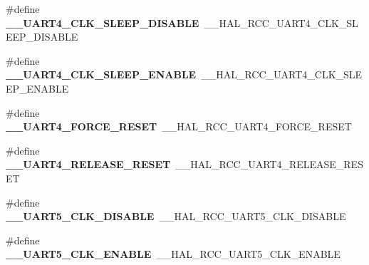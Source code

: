 \begin{DoxyCompactItemize}
\item 
\hypertarget{group___h_a_l___r_c_c___aliased_ga6eabcf2af5aee392a64df6c80f653d8c}{\#define {\bfseries \-\_\-\-\_\-\-U\-A\-R\-T4\-\_\-\-C\-L\-K\-\_\-\-S\-L\-E\-E\-P\-\_\-\-D\-I\-S\-A\-B\-L\-E}~\-\_\-\-\_\-\-H\-A\-L\-\_\-\-R\-C\-C\-\_\-\-U\-A\-R\-T4\-\_\-\-C\-L\-K\-\_\-\-S\-L\-E\-E\-P\-\_\-\-D\-I\-S\-A\-B\-L\-E}\label{group___h_a_l___r_c_c___aliased_ga6eabcf2af5aee392a64df6c80f653d8c}

\item 
\hypertarget{group___h_a_l___r_c_c___aliased_ga4c3526cdbbac0bdd4c1b71ff91685d08}{\#define {\bfseries \-\_\-\-\_\-\-U\-A\-R\-T4\-\_\-\-C\-L\-K\-\_\-\-S\-L\-E\-E\-P\-\_\-\-E\-N\-A\-B\-L\-E}~\-\_\-\-\_\-\-H\-A\-L\-\_\-\-R\-C\-C\-\_\-\-U\-A\-R\-T4\-\_\-\-C\-L\-K\-\_\-\-S\-L\-E\-E\-P\-\_\-\-E\-N\-A\-B\-L\-E}\label{group___h_a_l___r_c_c___aliased_ga4c3526cdbbac0bdd4c1b71ff91685d08}

\item 
\hypertarget{group___h_a_l___r_c_c___aliased_ga3fa11393865d20cc6a9dd7a3bb49a7e8}{\#define {\bfseries \-\_\-\-\_\-\-U\-A\-R\-T4\-\_\-\-F\-O\-R\-C\-E\-\_\-\-R\-E\-S\-E\-T}~\-\_\-\-\_\-\-H\-A\-L\-\_\-\-R\-C\-C\-\_\-\-U\-A\-R\-T4\-\_\-\-F\-O\-R\-C\-E\-\_\-\-R\-E\-S\-E\-T}\label{group___h_a_l___r_c_c___aliased_ga3fa11393865d20cc6a9dd7a3bb49a7e8}

\item 
\hypertarget{group___h_a_l___r_c_c___aliased_ga0ba28f261c094e2f6df78da62042fb59}{\#define {\bfseries \-\_\-\-\_\-\-U\-A\-R\-T4\-\_\-\-R\-E\-L\-E\-A\-S\-E\-\_\-\-R\-E\-S\-E\-T}~\-\_\-\-\_\-\-H\-A\-L\-\_\-\-R\-C\-C\-\_\-\-U\-A\-R\-T4\-\_\-\-R\-E\-L\-E\-A\-S\-E\-\_\-\-R\-E\-S\-E\-T}\label{group___h_a_l___r_c_c___aliased_ga0ba28f261c094e2f6df78da62042fb59}

\item 
\hypertarget{group___h_a_l___r_c_c___aliased_gafe498a3d4cfc62755072abdb7b20b865}{\#define {\bfseries \-\_\-\-\_\-\-U\-A\-R\-T5\-\_\-\-C\-L\-K\-\_\-\-D\-I\-S\-A\-B\-L\-E}~\-\_\-\-\_\-\-H\-A\-L\-\_\-\-R\-C\-C\-\_\-\-U\-A\-R\-T5\-\_\-\-C\-L\-K\-\_\-\-D\-I\-S\-A\-B\-L\-E}\label{group___h_a_l___r_c_c___aliased_gafe498a3d4cfc62755072abdb7b20b865}

\item 
\hypertarget{group___h_a_l___r_c_c___aliased_ga7b4b49db3dac7e83c37beed3dfd19980}{\#define {\bfseries \-\_\-\-\_\-\-U\-A\-R\-T5\-\_\-\-C\-L\-K\-\_\-\-E\-N\-A\-B\-L\-E}~\-\_\-\-\_\-\-H\-A\-L\-\_\-\-R\-C\-C\-\_\-\-U\-A\-R\-T5\-\_\-\-C\-L\-K\-\_\-\-E\-N\-A\-B\-L\-E}\label{group___h_a_l___r_c_c___aliased_ga7b4b49db3dac7e83c37beed3dfd19980}


\end{DoxyCompactItemize}
